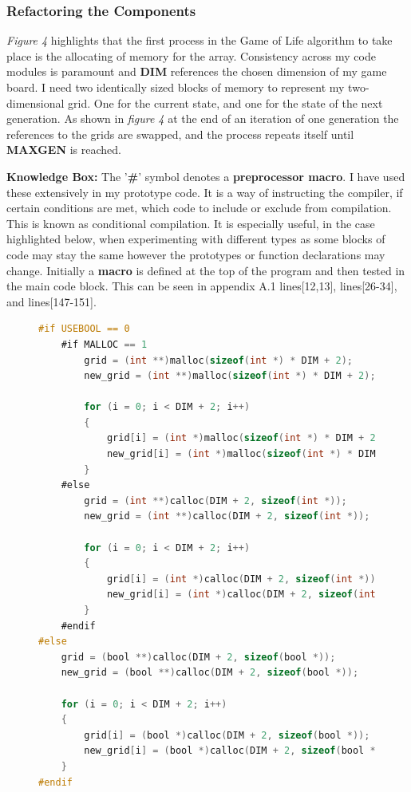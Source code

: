 \documentclass[11pt]{article} %
\begin{document}
\subsubsection{Refactoring the Components}
{\it Figure 4} highlights that the first process in the Game of Life algorithm to take place is the allocating of memory for the array. Consistency across my code modules is paramount and {\bf DIM} references the chosen dimension of my game board. I need two identically sized blocks of memory to represent my two-dimensional grid. One for the current state, and one for the state of the next generation. As shown in {\it figure 4} at the end of an iteration of one generation the references to the grids are swapped, and the process repeats itself until {\bf MAXGEN} is reached. 
\begin{mdframed}
{\bf Knowledge Box:} The '{\bf \#}' symbol denotes a {\bf preprocessor macro}. I have used these extensively in my prototype code. It is a way of instructing the compiler, if certain conditions are met, which code to include or exclude from compilation. This is known as conditional compilation. It is especially useful, in the case highlighted below, when experimenting with different types as some blocks of code may stay the same however the prototypes or function declarations may change. Initially a {\bf macro} is defined at the top of the program and then tested in the main code block. This can be seen in appendix A.1 lines[12,13], lines[26-34], and lines[147-151].
\end{mdframed}
\bigskip
\begin{figure}[h]
\begin{lstlisting}[language=C,caption={Array allocation using {\it malloc}, {\it calloc}, and {\it bool}}, morekeywords={malloc,calloc,bool}]
#if USEBOOL == 0
    #if MALLOC == 1      
        grid = (int **)malloc(sizeof(int *) * DIM + 2);
        new_grid = (int **)malloc(sizeof(int *) * DIM + 2);
        
        for (i = 0; i < DIM + 2; i++)
        {
            grid[i] = (int *)malloc(sizeof(int *) * DIM + 2);
            new_grid[i] = (int *)malloc(sizeof(int *) * DIM + 2);
        }            
    #else        
        grid = (int **)calloc(DIM + 2, sizeof(int *));
        new_grid = (int **)calloc(DIM + 2, sizeof(int *));
        
        for (i = 0; i < DIM + 2; i++)
        {
            grid[i] = (int *)calloc(DIM + 2, sizeof(int *));
            new_grid[i] = (int *)calloc(DIM + 2, sizeof(int *));
        }            
    #endif
#else
    grid = (bool **)calloc(DIM + 2, sizeof(bool *));
    new_grid = (bool **)calloc(DIM + 2, sizeof(bool *));
    
    for (i = 0; i < DIM + 2; i++)
    {
        grid[i] = (bool *)calloc(DIM + 2, sizeof(bool *));
        new_grid[i] = (bool *)calloc(DIM + 2, sizeof(bool *));
    }
#endif
\end{lstlisting}
\end{figure}
\end{document}

